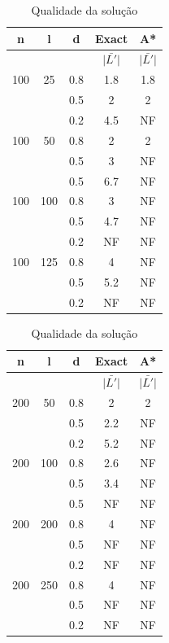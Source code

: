 \documentclass[12pt]{article}
\begin{document}
\begin{multicols}{2}
			\begin {table}[H]
				\begin{tabular}{c|c|c|c|c} \hline
					n & l & d & Exact & A* \\ \hline
					& & & $\bar{|L'|}$ & $\bar{|L'|}$ \\ \hline
					100 & 25  & 0.8 & 1.8 & 1.8\\
					   &      & 0.5 &  2 & 2\\
					   &      & 0.2 & 4.5 & NF\\ \hline
					100 & 50  & 0.8 &  2 & 2 \\
					   &      & 0.5 &  3 & NF\\
					   &      & 0.5 & 6.7 & NF\\ \hline
					100 & 100 & 0.8 &  3 & NF\\
					   &      & 0.5 & 4.7 & NF\\
					   &      & 0.2 & NF & NF\\ \hline
					100 & 125 & 0.8 & 4 & NF\\
					   &      & 0.5 & 5.2 & NF\\
					   &      & 0.2 & NF & NF\\ \hline
				\end{tabular}
				\caption {Qualidade da solução}
			\end {table}
			

			\begin {table}[H]
				\begin{tabular}{c|c|c|c|c} \hline
					n & l & d & Exact & A* \\ \hline
					& & & $\bar{|L'|}$ & $\bar{|L'|}$ \\ \hline
					200 & 50  & 0.8 & 2 & 2\\
					   &      & 0.5 & 2.2 & NF\\
					   &      & 0.2 & 5.2 & NF\\ \hline
					200 & 100  & 0.8 & 2.6 & NF \\
					   &      & 0.5 & 3.4 & NF\\
					   &      & 0.5 & NF & NF\\ \hline
					200 & 200 & 0.8 &  4 & NF\\
					   &      & 0.5 & NF & NF\\
					   &      & 0.2 & NF & NF\\ \hline
					200 & 250 & 0.8 & 4 & NF\\
					   &      & 0.5 & NF & NF\\
					   &      & 0.2 & NF & NF\\ \hline
				\end{tabular}
				\caption {Qualidade da solução}
			\end {table}


\end{multicols}
\end{document}
